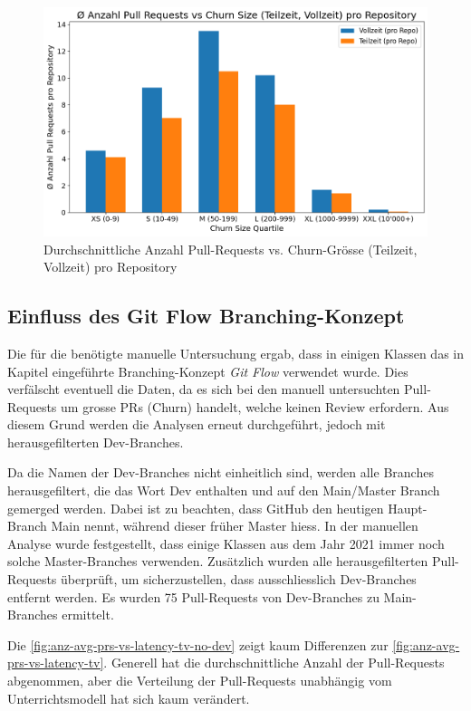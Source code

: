 \begin{figure}[htbp]
    \includegraphics[width=\textwidth]{Figures/avg-anz-prs-vs-churn-size-tz-vz-pro-repo.png}
    \caption{Durchschnittliche Anzahl Pull-Requests vs. Churn-Grösse (Teilzeit, Vollzeit) pro Repository}
    \label{fig:avg-anz-prs-vs-churn-size-tz-vz-pro-repo}
\end{figure}


\subsection{Einfluss des Git Flow Branching-Konzept}
Die für die  benötigte manuelle Untersuchung ergab, dass in einigen Klassen das in Kapitel  eingeführte Branching-Konzept \textit{Git Flow} verwendet wurde. Dies verfälscht eventuell die Daten, da es sich bei den manuell untersuchten Pull-Requests um grosse PRs (Churn) handelt, welche keinen Review erfordern. Aus diesem Grund werden die Analysen erneut durchgeführt, jedoch mit herausgefilterten Dev-Branches.

Da die Namen der Dev-Branches nicht einheitlich sind, werden alle Branches herausgefiltert, die das Wort Dev enthalten und auf den Main/Master Branch gemerged werden. Dabei ist zu beachten, dass GitHub den heutigen Haupt-Branch Main nennt, während dieser früher Master hiess. In der manuellen Analyse wurde festgestellt, dass einige Klassen aus dem Jahr 2021 immer noch solche Master-Branches verwenden. Zusätzlich wurden alle herausgefilterten Pull-Requests überprüft, um sicherzustellen, dass ausschliesslich Dev-Branches entfernt werden. Es wurden 75 Pull-Requests von Dev-Branches zu Main-Branches ermittelt.

\newpage
Die \autoref{fig:anz-avg-prs-vs-latency-tv-no-dev} zeigt kaum Differenzen zur \autoref{fig:anz-avg-prs-vs-latency-tv}. Generell hat die durchschnittliche Anzahl der Pull-Requests abgenommen, aber die Verteilung der Pull-Requests unabhängig vom Unterrichtsmodell hat sich kaum verändert. 

